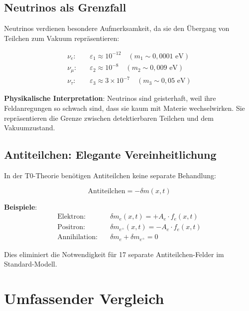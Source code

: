 \documentclass[12pt,a4paper]{article}
\newcommand{\deltam}{\delta m}
\begin{document}
	\subsection{Neutrinos als Grenzfall}
	
	Neutrinos verdienen besondere Aufmerksamkeit, da sie den Übergang von Teilchen zum Vakuum repräsentieren:
	
	\begin{equation}
		\begin{aligned}
			\nu_e: \quad &\varepsilon_1 \approx 10^{-12} \quad (m_1 \sim 0{,}0001 \text{ eV}) \\
			\nu_\mu: \quad &\varepsilon_2 \approx 10^{-8} \quad (m_2 \sim 0{,}009 \text{ eV}) \\
			\nu_\tau: \quad &\varepsilon_3 \approx 3 \times 10^{-7} \quad (m_3 \sim 0{,}05 \text{ eV})
		\end{aligned}
		\label{eq:neutrino_spectrum}
	\end{equation}
	
	\textbf{Physikalische Interpretation}: Neutrinos sind geisterhaft, weil ihre Feldanregungen so schwach sind, dass sie kaum mit Materie wechselwirken. Sie repräsentieren die Grenze zwischen detektierbaren Teilchen und dem Vakuumzustand.
	
	\subsection{Antiteilchen: Elegante Vereinheitlichung}
	
	In der T0-Theorie benötigen Antiteilchen keine separate Behandlung:
	
	\begin{equation}
		\boxed{\text{Antiteilchen} = -\deltam(x,t)}
		\label{eq:antiparticle_unification}
	\end{equation}
	
	\textbf{Beispiele}:
	\begin{align}
		\text{Elektron}: \quad &\deltam_e(x,t) = +A_e \cdot f_e(x,t) \\
		\text{Positron}: \quad &\deltam_{e^+}(x,t) = -A_e \cdot f_e(x,t) \\
		\text{Annihilation}: \quad &\deltam_e + \deltam_{e^+} = 0
	\end{align}
	
	Dies eliminiert die Notwendigkeit für 17 separate Antiteilchen-Felder im Standard-Modell.
	
	\section{Umfassender Vergleich}
	
\end{document}
